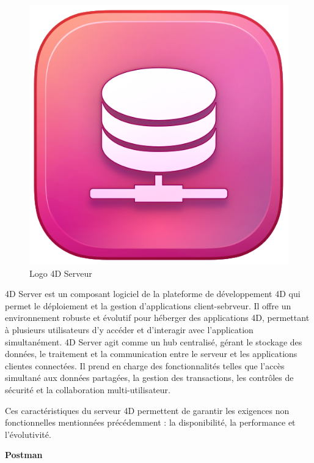 \begin{figure}[htbp]
   \centering
   \includegraphics[scale=0.2]{Images/4dsrv.png} 
   \caption{Logo 4D Serveur\cite{4d}}
   \label{fig:4dsrv}
\end{figure}

4D Server est un composant logiciel de la plateforme de développement 
4D qui permet le déploiement et la gestion
d’applications client-sebrveur. Il offre un environnement robuste 
et évolutif pour héberger des applications 4D, 
permettant à plusieurs utilisateurs d’y accéder et d’interagir avec
l’application simultanément. 4D Server agit comme un hub centralisé, 
gérant le stockage des données, le traitement et la communication entre 
le serveur et les applications clientes connectées. Il prend en charge 
des fonctionnalités telles que l’accès simultané aux données partagées, 
la gestion des transactions, les contrôles de sécurité et la collaboration
multi-utilisateur\cite{4d}.
\newline

Ces caractéristiques du serveur 4D permettent de garantir les exigences non fonctionnelles mentionnées précédemment : la disponibilité, la performance et l'évolutivité. 
\newline

\large 
\textbf{Postman}

